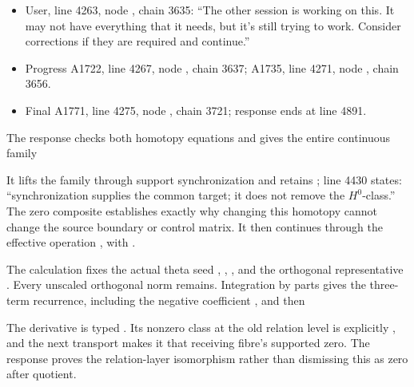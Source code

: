 \begin{itemize}
\tightlist
\item
  User, line 4263, node
  \protect{}, chain 3635: ``The
  other session is working on this. It may not have everything that it
  needs, but it's still trying to work. Consider corrections if they are
  required and continue.''
\item
  Progress A1722, line 4267, node
  \protect{}, chain 3637;
  A1735, line 4271, node
  \protect{}, chain 3656.
\item
  Final A1771, line 4275, node
  \protect{}, chain 3721;
  response ends at line 4891.
\end{itemize}

The response checks both homotopy equations and gives the entire
continuous family


It lifts the family through support synchronization and retains
\protect{}; line 4430 states: ``synchronization
supplies the common target; it does not remove the \(H^0\)-class.'' The
zero composite \protect{} establishes
exactly why changing this homotopy cannot change the source boundary or
control matrix. It then continues through the effective operation
\protect{}, with \protect{}.

The calculation fixes the actual theta seed
\protect{},
\protect{},
\protect{}, and the orthogonal representative
\protect{}. Every unscaled orthogonal norm
\protect{} remains. Integration by parts
gives the three-term recurrence, including the negative coefficient
\protect{}, and then


The derivative is typed \protect{}. Its nonzero
class at the old relation level is explicitly
\protect{}, and the next transport makes it that
receiving fibre's supported zero. The response proves the relation-layer
isomorphism rather than dismissing this as zero after quotient.

